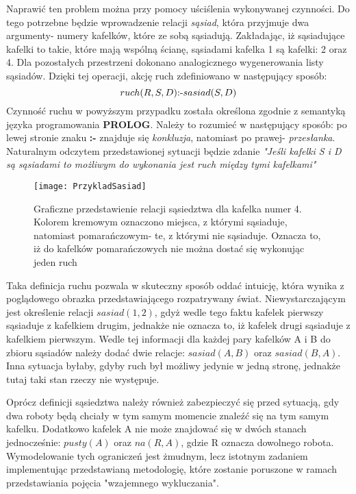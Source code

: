     Naprawić ten problem można przy pomocy uściślenia wykonywanej czynności. Do tego potrzebne będzie wprowadzenie relacji \textit{sąsiad}, która 
    przyjmuje dwa argumenty- numery kafelków, które ze sobą sąsiadują. Zakładając, iż sąsiadujące kafelki to takie, które mają wspólną ścianę, sąsiadami 
    kafelka 1 są kafelki: 2 oraz 4. Dla pozostałych przestrzeni dokonano analogicznego wygenerowania listy sąsiadów. Dzięki tej operacji, 
    akcję ruch zdefiniowano w następujący sposób:
    \begin{equation}
        ruch(R,S,D) \textnormal{:-} sasiad(S,D)
    \end{equation}
    Czynność ruchu w powyższym przypadku została określona zgodnie z semantyką języka programowania \textbf{PROLOG}. Należy to rozumieć w następujący sposób:
    po lewej stronie znaku \textbf{:-} znajduje się \textit{konkluzja}, natomiast po prawej- \textit{przesłanka}. Naturalnym odczytem przedstawionej sytuacji
    będzie zdanie \textit{"Jeśli kafelki S i D są sąsiadami to możliwym do wykonania jest ruch między tymi kafelkami"}
    \begin{figure}[H]
        \texttt{[image: PrzykladSasiad]}
        \centering
        \caption{Graficzne przedstawienie relacji sąsiedztwa dla kafelka numer 4. Kolorem kremowym oznaczono miejsca, z którymi sąsiaduje, natomiast 
        pomarańczowym- te, z którymi nie sąsiaduje. Oznacza to, iż do kafelków pomarańczowych nie można dostać się wykonując jeden ruch}
        \label{PrzykladAkcje}
    \end{figure}
    Taka definicja ruchu pozwala w skuteczny sposób oddać intuicję, która wynika z poglądowego obrazka przedstawiającego rozpatrywany świat.
    Niewystarczającym jest określenie relacji $sasiad(1,2)$, gdyż wedle tego faktu kafelek pierwszy sąsiaduje z kafelkiem drugim, jednakże nie oznacza 
    to, iż kafelek drugi sąsiaduje z kafelkiem pierwszym. Wedle tej informacji dla każdej pary kafelków A i B do zbioru sąsiadów należy dodać dwie relacje:
    $sasiad(A,B)$ oraz $sasiad(B,A)$. Inna sytuacja byłaby, gdyby ruch był możliwy jedynie w jedną stronę, jednakże tutaj taki stan rzeczy nie występuje.


    Oprócz definicji sąsiedztwa należy również zabezpieczyć się przed sytuacją, gdy dwa roboty będą chciały w tym samym momencie znaleźć się na tym samym 
    kafelku. Dodatkowo kafelek A nie może znajdować się w dwóch stanach jednocześnie: $pusty(A)$ oraz $na(R,A)$, gdzie R oznacza dowolnego robota. 
    Wymodelowanie tych ograniczeń jest żmudnym, lecz istotnym zadaniem implementując przedstawianą metodologię, które zostanie poruszone w ramach 
    przedstawiania pojęcia "wzajemnego wykluczania".
    
